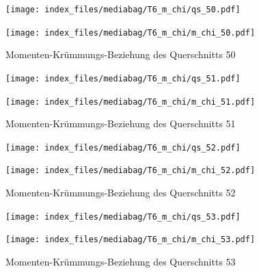 \documentclass[
  11pt,
  letterpaper,
]{scrreprt}
\begin{document}
\begin{figure}[H]

\begin{minipage}{0.50\linewidth}
\texttt{[image: index\_files/mediabag/T6\_m\_chi/qs\_50.pdf]}\end{minipage}%
%
\begin{minipage}{0.50\linewidth}
\texttt{[image: index\_files/mediabag/T6\_m\_chi/m\_chi\_50.pdf]}\end{minipage}%

\caption{\label{fig-mchi_anhang}Momenten-Krümmungs-Beziehung des
Querschnitts 50}

\end{figure}%

\begin{figure}[H]

\begin{minipage}{0.50\linewidth}
\texttt{[image: index\_files/mediabag/T6\_m\_chi/qs\_51.pdf]}\end{minipage}%
%
\begin{minipage}{0.50\linewidth}
\texttt{[image: index\_files/mediabag/T6\_m\_chi/m\_chi\_51.pdf]}\end{minipage}%

\caption{\label{fig-mchi_anhang}Momenten-Krümmungs-Beziehung des
Querschnitts 51}

\end{figure}%

\begin{figure}[H]

\begin{minipage}{0.50\linewidth}
\texttt{[image: index\_files/mediabag/T6\_m\_chi/qs\_52.pdf]}\end{minipage}%
%
\begin{minipage}{0.50\linewidth}
\texttt{[image: index\_files/mediabag/T6\_m\_chi/m\_chi\_52.pdf]}\end{minipage}%

\caption{\label{fig-mchi_anhang}Momenten-Krümmungs-Beziehung des
Querschnitts 52}

\end{figure}%

\begin{figure}[H]

\begin{minipage}{0.50\linewidth}
\texttt{[image: index\_files/mediabag/T6\_m\_chi/qs\_53.pdf]}\end{minipage}%
%
\begin{minipage}{0.50\linewidth}
\texttt{[image: index\_files/mediabag/T6\_m\_chi/m\_chi\_53.pdf]}\end{minipage}%

\caption{\label{fig-mchi_anhang}Momenten-Krümmungs-Beziehung des
Querschnitts 53}

\end{figure}%
\end{document}
